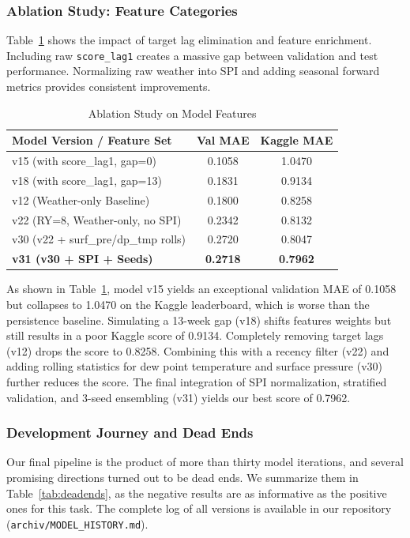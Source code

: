 \documentclass[conference]{IEEEtran}
\begin{document}
\subsubsection{Ablation Study: Feature Categories}
Table~\ref{tab:ablation} shows the impact of target lag elimination and feature enrichment. Including raw \texttt{score\_lag1} creates a massive gap between validation and test performance. Normalizing raw weather into SPI and adding seasonal forward metrics provides consistent improvements.

\begin{table}[htbp]
\caption{Ablation Study on Model Features}
\begin{center}
\begin{tabular}{lcc}
\toprule
\textbf{Model Version / Feature Set} & \textbf{Val MAE} & \textbf{Kaggle MAE} \\
\midrule
v15 (with score\_lag1, gap=0)      & 0.1058 & 1.0470 \\
v18 (with score\_lag1, gap=13)     & 0.1831 & 0.9134 \\
v12 (Weather-only Baseline)         & 0.1800 & 0.8258 \\
v22 (RY=8, Weather-only, no SPI)    & 0.2342 & 0.8132 \\
v30 (v22 + surf\_pre/dp\_tmp rolls) & 0.2720 & 0.8047 \\
\textbf{v31 (v30 + SPI + Seeds)}   & \textbf{0.2718} & \textbf{0.7962} \\
\bottomrule
\end{tabular}
\label{tab:ablation}
\end{center}
\end{table}

As shown in Table~\ref{tab:ablation}, model v15 yields an exceptional validation MAE of 0.1058 but collapses to 1.0470 on the Kaggle leaderboard, which is worse than the persistence baseline. Simulating a 13-week gap (v18) shifts features weights but still results in a poor Kaggle score of 0.9134. Completely removing target lags (v12) drops the score to 0.8258. Combining this with a recency filter (v22) and adding rolling statistics for dew point temperature and surface pressure (v30) further reduces the score. The final integration of SPI normalization, stratified validation, and 3-seed ensembling (v31) yields our best score of 0.7962.

\subsubsection{Development Journey and Dead Ends}
\label{sec:deadends}
Our final pipeline is the product of more than thirty model iterations, and several promising directions turned out to be dead ends. We summarize them in Table~\ref{tab:deadends}, as the negative results are as informative as the positive ones for this task. The complete log of all versions is available in our repository (\texttt{archiv/MODEL\_HISTORY.md}).
\end{document}
